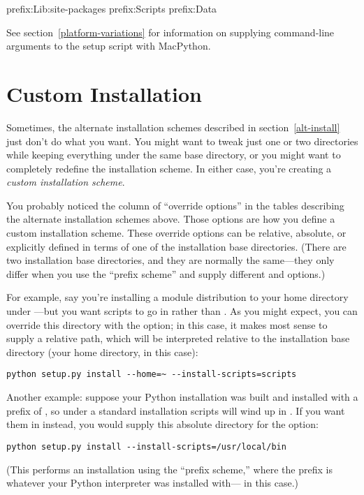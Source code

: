 \documentclass{howto}
\begin{document}
              {prefix}{:Lib:site-packages}
              {prefix}{:Scripts}
              {prefix}{:Data}

See section~\ref{platform-variations} for information on supplying
command-line arguments to the setup script with MacPython.


\section{Custom Installation}
\label{custom-install}

Sometimes, the alternate installation schemes described in
section~\ref{alt-install} just don't do what you want.  You might
want to tweak just one or two directories while keeping everything under
the same base directory, or you might want to completely redefine the
installation scheme.  In either case, you're creating a \emph{custom
  installation scheme}.

You probably noticed the column of ``override options'' in the tables
describing the alternate installation schemes above.  Those options are
how you define a custom installation scheme.  These override options can
be relative, absolute, or explicitly defined in terms of one of the
installation base directories.  (There are two installation base
directories, and they are normally the same---they only differ when you
use the \UNIX{} ``prefix scheme'' and supply different
 and  options.)

For example, say you're installing a module distribution to your home
directory under \UNIX---but you want scripts to go in
 rather than .
As you might expect, you can override this directory with the
 option; in this case, it makes most
sense to supply a relative path, which will be interpreted relative to
the installation base directory (your home directory, in this case):
\begin{verbatim}
python setup.py install --home=~ --install-scripts=scripts
\end{verbatim}

Another \UNIX{} example: suppose your Python installation was built and
installed with a prefix of , so under a standard 
installation scripts will wind up in .  If
you want them in  instead, you would supply this
absolute directory for the  option:
\begin{verbatim}
python setup.py install --install-scripts=/usr/local/bin
\end{verbatim}
(This performs an installation using the ``prefix scheme,'' where the
prefix is whatever your Python interpreter was installed with---
 in this case.)
\end{document}
